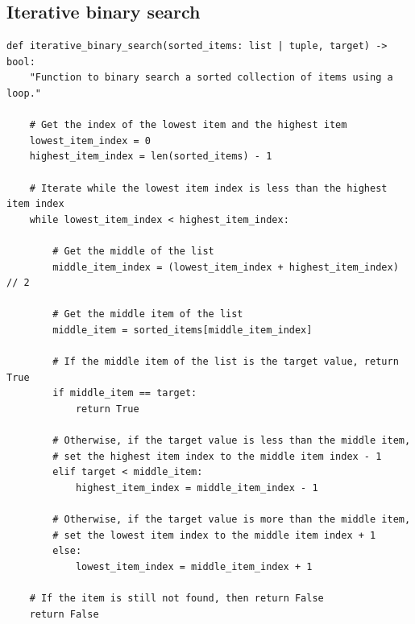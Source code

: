 \documentclass[11pt]{article}
\begin{document}
\subsection{Iterative binary search}
\label{sec:org081d26f}
\begin{verbatim}
def iterative_binary_search(sorted_items: list | tuple, target) -> bool:
    "Function to binary search a sorted collection of items using a loop."

    # Get the index of the lowest item and the highest item
    lowest_item_index = 0
    highest_item_index = len(sorted_items) - 1

    # Iterate while the lowest item index is less than the highest item index
    while lowest_item_index < highest_item_index:

        # Get the middle of the list
        middle_item_index = (lowest_item_index + highest_item_index) // 2

        # Get the middle item of the list
        middle_item = sorted_items[middle_item_index]

        # If the middle item of the list is the target value, return True
        if middle_item == target:
            return True

        # Otherwise, if the target value is less than the middle item,
        # set the highest item index to the middle item index - 1
        elif target < middle_item:
            highest_item_index = middle_item_index - 1

        # Otherwise, if the target value is more than the middle item,
        # set the lowest item index to the middle item index + 1
        else:
            lowest_item_index = middle_item_index + 1

    # If the item is still not found, then return False
    return False
\end{verbatim}

 \newpage
\end{document}
